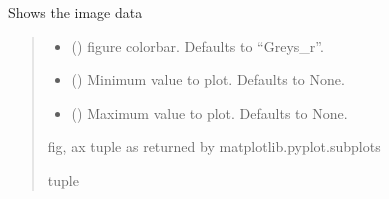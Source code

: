 \documentclass[letterpaper,10pt,english]{sphinxmanual}
\begin{document}
\begin{fulllineitems}
\begin{fulllineitems}
\label{\detokenize{micropolarray:micropolarray.image.Image.show}}
\pysigstartsignatures
{}
\pysigstopsignatures
\sphinxAtStartPar
Shows the image data
\begin{quote}\begin{description}
\begin{itemize}
\item {} 
\sphinxAtStartPar
{} (\sphinxstyleliteralemphasis{\sphinxupquote{, }}) \textendash{} figure colorbar. Defaults to “Greys\_r”.

\item {} 
\sphinxAtStartPar
{} (\sphinxstyleliteralemphasis{\sphinxupquote{, }}) \textendash{} Minimum value to plot. Defaults to None.

\item {} 
\sphinxAtStartPar
{} (\sphinxstyleliteralemphasis{\sphinxupquote{, }}) \textendash{} Maximum value to plot. Defaults to None.

\end{itemize}

\sphinxAtStartPar
fig, ax tuple as returned by matplotlib.pyplot.subplots

\sphinxAtStartPar
tuple

\end{description}\end{quote}

\end{fulllineitems}



\end{fulllineitems}
\end{document}
